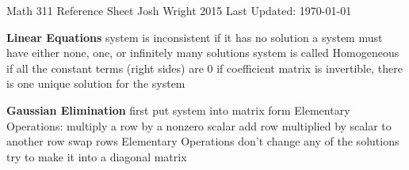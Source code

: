 \documentclass[12pt]{article}
\begin{document}
\begin{center}
Math 311 Reference Sheet
\hfill \textcopyright{} Josh Wright 2015 \hfill
Last Updated: \today
\end{center}

\begin{multicols*}{2}
\begin{flushleft}
\begin{outline}[longenum]

\newlength{\upspacelength}
\setlength{\upspacelength}{0px}
\newcommand{\upspace}{\vspace{\upspacelength}}
\newcommand{\zzz}[1]{\upspace\0 \textbf{#1} }
\let\oldOne\1\let\oldTwo\2\let\oldThree\3\let\oldFour\4
\renewcommand{\1}{\upspace{}\oldOne{}}
\renewcommand{\2}{\upspace{}\oldTwo{}}
\renewcommand{\3}{\upspace{}\oldThree{}}
\renewcommand{\4}{\upspace{}\oldFour{}}


\zzz{Linear Equations}
  \1 system is inconsistent if it has no solution
  \1 a system must have either none, one, or infinitely many solutions
  \1 system is called Homogeneous if all the constant terms (right sides) are 0
  \1 if coefficient matrix is invertible, there is one unique solution for the system

\zzz{Gaussian Elimination}
  \1 first put system into matrix form
  \1 Elementary Operations:
    \2 multiply a row by a nonzero scalar
    \2 add row multiplied by scalar to another row
    \2 swap rows
  \1 Elementary Operations don't change any of the solutions
  \1 try to make it into a diagonal matrix


\end{outline}
\end{flushleft}
\end{multicols*}
\end{document}
